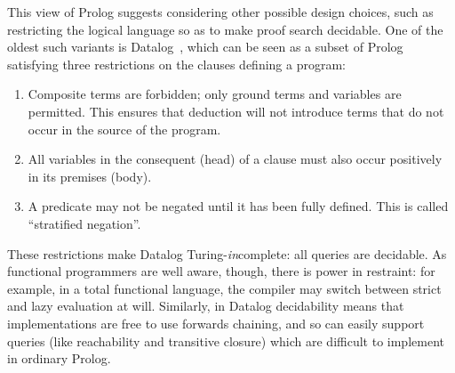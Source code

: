 
This view of Prolog suggests considering other possible design choices, such as
restricting the logical language so as to make proof search decidable. One of
the oldest such variants is Datalog~\cite{datalog}, which can be seen as a
subset of Prolog satisfying three restrictions on the clauses defining a
program:

\begin{enumerate}
\item Composite terms are forbidden; only ground terms and variables are
  permitted. This ensures that deduction will not introduce terms that do not
  occur in the source of the program.


\item All variables in the consequent (head) of a clause must also occur
  positively in its premises (body).

\item A predicate may not be negated until it has been fully defined. This is
  called ``stratified negation''.
\end{enumerate}

These restrictions make Datalog Turing-\emph{in}complete: all queries are
decidable. As functional programmers are well aware, though, there is power in
restraint: for example, in a total functional language, the compiler may switch
between strict and lazy evaluation at will. Similarly, in Datalog decidability
means that implementations are free to use forwards chaining, and so can easily
support queries (like reachability and transitive closure) which are difficult
to implement in ordinary Prolog.

%

